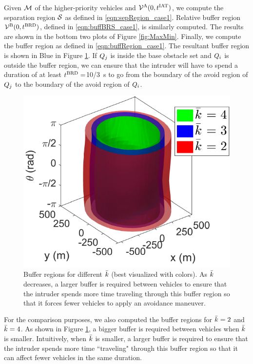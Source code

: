 Given $\mathcal{M}$ of the higher-priority vehicles and $\mathcal{V}^{\text{A}}(0, t^\text{IAT})$, we compute the separation region $\mathcal{S}$ as defined in \eqref{eqn:sepRegion_case1}. Relative buffer region $\mathcal{V}^{\text{B}}(0, t^\text{BRD})$, defined in \eqref{eqn:buffBRS_case1}, is similarly computed. The results are shown in the bottom two plots of Figure \ref{fig:MaxMin}. Finally, we compute the buffer region as defined in \eqref{eqn:buffRegion_case1}. The resultant buffer region is shown in Blue in Figure \ref{fig:buffRegions}. If $Q_j$ is inside the base obstacle set and $Q_i$ is outside the buffer region, we can ensure that the intruder will have to spend a duration of at least $t^\text{BRD} = $\SI{10/3}{\s} to go from the boundary of the avoid region of $Q_j$ to the boundary of the avoid region of $Q_i$. 
\begin{figure}
  \centering
  \includegraphics[width=0.6\columnwidth]{figs/bufferRegions_3D}
  \caption{Buffer regions for different $\bar{k}$ (best visualized with colors). As $\bar{k}$ decreases, a larger buffer is required between vehicles to ensure that the intruder spends more time traveling through this buffer region so that it forces fewer vehicles to apply an avoidance maneuver.}
  \label{fig:buffRegions}
\end{figure}

For the comparison purposes, we also computed the buffer regions for $\bar{k} = 2$ and $\bar{k} = 4$. 
As shown in Figure \ref{fig:buffRegions}, a bigger buffer is required between vehicles when $\bar{k}$ is smaller. Intuitively, when $\bar{k}$ is smaller, a larger buffer is required to ensure that the intruder spends more time ``traveling" through this buffer region so that it can affect fewer vehicles in the same duration.             

